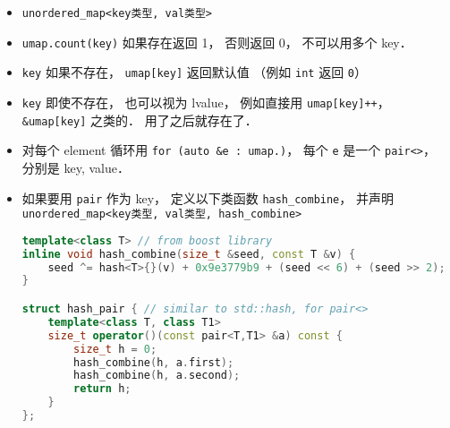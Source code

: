 
\begin{issues}
\issueDraft
\end{issues}

\begin{itemize}
\item \verb|unordered_map<key类型, val类型>|
\item \verb|umap.count(key)| 如果存在返回 1， 否则返回 0， 不可以用多个 key．
\item \verb|key| 如果不存在， \verb|umap[key]| 返回默认值 （例如 \verb|int| 返回 \verb|0|）
\item \verb|key| 即使不存在， 也可以视为 lvalue， 例如直接用 \verb|umap[key]++|， \verb|&umap[key]| 之类的． 用了之后就存在了．
\item 对每个 element 循环用 \verb|for (auto &e : umap.)|， 每个 \verb|e| 是一个 \verb|pair<>|， 分别是 key, value．
\item 如果要用 \verb|pair| 作为 key， 定义以下类函数 \verb|hash_combine|， 并声明 \verb|unordered_map<key类型, val类型, hash_combine>|
\begin{lstlisting}[language=cpp]
template<class T> // from boost library
inline void hash_combine(size_t &seed, const T &v) {
    seed ^= hash<T>{}(v) + 0x9e3779b9 + (seed << 6) + (seed >> 2);
}

struct hash_pair { // similar to std::hash, for pair<>
    template<class T, class T1>
    size_t operator()(const pair<T,T1> &a) const {
        size_t h = 0;
        hash_combine(h, a.first);
        hash_combine(h, a.second);
        return h;
    }
};
\end{lstlisting}
\end{itemize}
